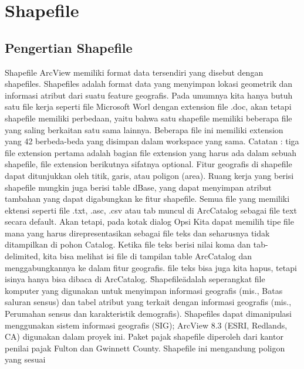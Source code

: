 

\section{Shapefile}
\subsection{Pengertian Shapefile}
Shapefile ArcView memiliki format data tersendiri yang disebut dengan shapefiles. 
Shapefiles adalah format data yang menyimpan lokasi geometrik dan informasi atribut dari suatu feature geografis. 
Pada umumnya kita hanya butuh satu file kerja seperti file Microsoft Worl dengan extension file .doc, 
akan tetapi shapefile memiliki perbedaan, yaitu bahwa satu shapefile memiliki beberapa file yang saling berkaitan satu sama lainnya. 
Beberapa file ini memiliki extension yang 42 berbeda-beda yang disimpan dalam workspace yang sama.
Catatan : tiga file extension pertama adalah bagian file extension yang harus ada dalam sebuah shapefile, file extension berikutnya sifatnya optional. \cite{surya2013sistem}
Fitur geografis di shapefile dapat ditunjukkan oleh titik, garis, atau poligon (area). Ruang kerja yang berisi shapefile
mungkin juga berisi table dBase, yang dapat menyimpan atribut tambahan yang dapat digabungkan ke fitur shapefile.
Semua file yang memiliki ektensi seperti file .txt, .asc, .csv atau tab muncul di ArcCatalog sebagai file text secara default.
Akan tetapi, pada kotak dialog Opsi Kita dapat memilih tipe file mana yang harus direpresentasikan sebagai file
teks dan seharusnya tidak ditampilkan di pohon Catalog. Ketika file teks berisi nilai koma dan tab-delimited,
kita bisa melihat isi file di tampilan table ArcCatalog dan menggabungkannya ke dalam fitur geografis. file teks bisa juga kita hapus, tetapi isinya hanya bisa dibaca di ArcCatalog.
\"Shapefile\" adalah seperangkat file komputer yang digunakan untuk menyimpan informasi geografis (mis., Batas saluran sensus) 
dan tabel atribut yang terkait dengan informasi geografis (mis., Perumahan sensus dan karakteristik demografis). Shapefiles dapat 
dimanipulasi menggunakan sistem informasi geografis (SIG); ArcView 8.3 (ESRI, Redlands, CA) digunakan dalam proyek ini. 
Paket pajak shapefile diperoleh dari kantor penilai pajak Fulton dan Gwinnett County. Shapefile ini mengandung poligon yang sesuai 
